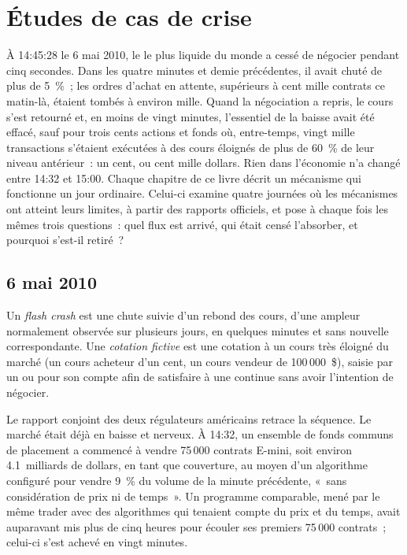 \chapter{Études de cas de crise}\label{ch:m1:stress-case-studies}

À 14:45:28 le 6 mai 2010, le  le plus liquide du monde a cessé
de négocier pendant cinq secondes. Dans les quatre minutes et demie précédentes, il
avait chuté de plus de 5~\%~; les ordres d'achat en attente, supérieurs à cent mille
contrats ce matin-là, étaient tombés à environ mille. Quand la négociation a repris, le
cours s'est retourné et, en moins de vingt minutes, l'essentiel de la baisse avait été
effacé, sauf pour trois cents actions et fonds où, entre-temps, vingt mille transactions
s'étaient exécutées à des cours éloignés de plus de 60~\% de leur niveau antérieur~: un
cent, ou cent mille dollars. Rien dans l'économie n'a changé entre 14:32 et 15:00.
Chaque chapitre de ce livre décrit un mécanisme qui fonctionne un jour ordinaire.
Celui-ci examine quatre journées où les mécanismes ont atteint leurs limites, à partir
des rapports officiels, et pose à chaque fois les mêmes trois questions~: quel flux
est arrivé, qui était censé l'absorber, et pourquoi s'est-il retiré~?

\section{6 mai 2010}

\begin{definition}\label{def:m1:stress-case-studies:flash}
Un \emph{flash crash} est une chute suivie d'un rebond des cours, d'une
ampleur normalement observée sur plusieurs jours, en quelques minutes et sans nouvelle
correspondante. Une \emph{cotation fictive} est une cotation à un cours très éloigné du marché
(un cours acheteur d'un cent, un cours vendeur de 100\,000~\$), saisie par un  ou pour son compte afin de
satisfaire à une  continue sans avoir l'intention de négocier.
\end{definition}

Le rapport conjoint des deux régulateurs américains retrace la séquence. Le marché
était déjà en baisse et nerveux. À 14:32, un ensemble de fonds communs de placement a commencé à vendre
75\,000 contrats E-mini, soit environ 4.1~milliards de dollars, en tant que couverture, au moyen
d'un algorithme configuré pour vendre 9~\% du volume de la minute précédente, «~sans
considération de prix ni de temps~». Un programme comparable, mené par le même trader
avec des algorithmes qui tenaient compte du prix et du temps, avait auparavant mis plus de
cinq heures pour écouler ses premiers 75\,000 contrats~; celui-ci s'est achevé en vingt
minutes.

